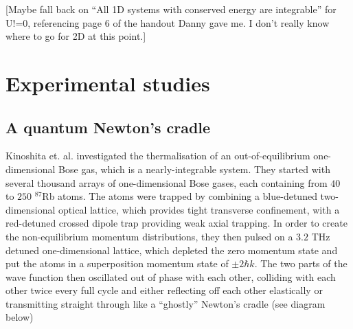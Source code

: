 \documentclass[a4paper, 10pt]{article}
\theoremstyle{plain}
\begin{document}
 [Maybe fall back on ``All 1D systems with conserved
energy are integrable'' for U!=0, referencing page 6 of the handout Danny gave
me. I don't really know where to go for 2D at this point.]


\section{Experimental studies}

\subsection{A quantum Newton's cradle}

Kinoshita et. al. investigated \cite{Kinoshita2006} the thermalisation of an
out-of-equilibrium one-dimensional Bose gas, which is a  nearly-integrable system. They
started with several thousand arrays of one-dimensional Bose gases, each
containing from $40$ to $250$ $^{87}$Rb atoms. The atoms were trapped by
combining a blue-detuned  two-dimensional optical lattice, 
which provides tight transverse confinement, with a red-detuned crossed dipole 
trap providing weak axial trapping. In order
to create the non-equilibrium momentum distributions, they then pulsed on a
$3.2$ THz detuned one-dimensional lattice, which depleted the zero momentum state
and put the atoms in a superposition momentum state of $\pm2\hbar k$. The two
parts of the wave function then oscillated out of phase with each other,
colliding with each other twice every full cycle and either reflecting off
each other elastically or transmitting straight through like a ``ghostly''
Newton's cradle (see diagram below)
\end{document}
